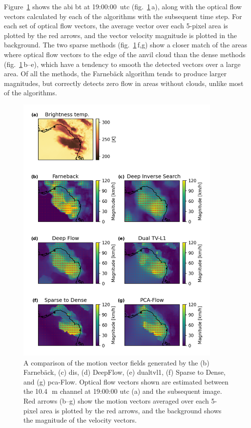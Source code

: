Figure~\ref{fig:opt_flow_comparison} shows the \acrshort{abi} \acrshort{bt} at 19:00:00~\acrshort{utc} (fig.~\ref{fig:opt_flow_comparison}\,a), along with the optical flow vectors calculated by each of the algorithms with the subsequent time step.
For each set of optical flow vectors, the average vector over each 5-pixel area is plotted by the red arrows, and the vector velocity magnitude is plotted in the background.
The two sparse methods (fig.~\ref{fig:opt_flow_comparison}\,f,g) show a closer match of the areas where optical flow vectors to the edge of the anvil cloud than the dense methods (fig.~\ref{fig:opt_flow_comparison}\,b--e), which have a tendency to smooth the detected vectors over a large area.
Of all the methods, the Farnebäck algorithm tends to produce larger magnitudes, but correctly detects zero flow in areas without clouds, unlike most of the algorithms.


\begin{figure}[tp]
    \centering
    \includegraphics[width=0.9\textwidth]{figures/chapter1_10.png}
    \caption[
    A comparison of the motion vector fields generated by different optical flow methods
    ]{
    A comparison of the motion vector fields generated by the (b) Farnebäck, (c) \acrshort{dis}, (d) DeepFlow, (e) \acrshort{dualtvl1}, (f) Sparse to Dense, and (g) \acrshort{pca}-Flow. Optical flow vectors shown are estimated between the 10.4\,\unit{\mu m} channel at 19:00:00 \acrshort{utc} (a) and the subsequent image. Red arrows (b--g) show the motion vectors averaged over each 5-pixel area is plotted by the red arrows, and the background shows the magnitude of the velocity vectors.
    }
    \label{fig:opt_flow_comparison}
\end{figure}


